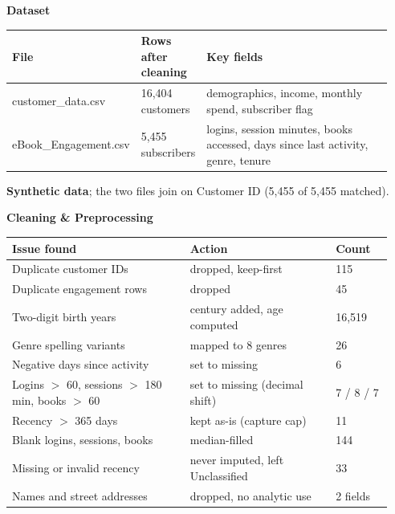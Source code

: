 \documentclass[final]{beamer}
\newlength{\colwidth}
\begin{document}
\begin{frame}[t]
\begin{columns}[t]
\begin{column}{\colwidth}
\begin{block}{\textbf{Dataset}}
\fontsize{20}{25}\selectfont
\centering
\setlength{\tabcolsep}{4pt}
\begin{tabular}{p{0.28\linewidth} p{0.17\linewidth} p{0.49\linewidth}}
\toprule
\textbf{File} & \textbf{Rows after cleaning} & \textbf{Key fields} \\
\midrule
customer\_data.csv & 16,404 customers & demographics, income, monthly spend, subscriber flag \\
eBook\_Engagement.csv & 5,455 subscribers & logins, session minutes, books accessed, days since last activity, genre, tenure \\
\bottomrule
\end{tabular}

\raggedright
\vspace{0.3em}
\textbf{Synthetic data}; the two files join on Customer ID (5,455 of 5,455 matched).
\end{block}
\vspace{0.5cm}

\begin{block}{\textbf{Cleaning \& Preprocessing}}
\fontsize{20}{25}\selectfont
\centering
\setlength{\tabcolsep}{4pt}
\begin{tabular}{p{0.44\linewidth} p{0.36\linewidth} p{0.14\linewidth}}
\toprule
\textbf{Issue found} & \textbf{Action} & \textbf{Count} \\
\midrule
Duplicate customer IDs & dropped, keep-first & 115 \\
Duplicate engagement rows & dropped & 45 \\
Two-digit birth years & century added, age computed & 16,519 \\
Genre spelling variants & mapped to 8 genres & 26 \\
Negative days since activity & set to missing & 6 \\
Logins $>$ 60, sessions $>$ 180 min, books $>$ 60 & set to missing (decimal shift) & 7 / 8 / 7 \\
Recency $>$ 365 days & kept as-is (capture cap) & 11 \\
Blank logins, sessions, books & median-filled & 144 \\
Missing or invalid recency & never imputed, left Unclassified & 33 \\
Names and street addresses & dropped, no analytic use & 2 fields \\
\bottomrule
\end{tabular}
\end{block}
\vspace{0.5cm}


\end{column}
\end{columns}
\end{frame}
\end{document}
